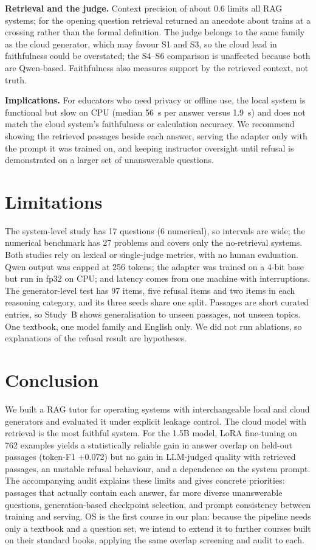 \documentclass[conference]{IEEEtran}
\begin{document}
\textbf{Retrieval and the judge.} Context precision of about 0.6 limits all RAG systems; for the opening question retrieval returned an anecdote about trains at a crossing rather than the formal definition. The judge belongs to the same family as the cloud generator, which may favour S1 and S3, so the cloud lead in faithfulness could be overstated; the S4--S6 comparison is unaffected because both are Qwen-based. Faithfulness also measures support by the retrieved context, not truth.

\textbf{Implications.} For educators who need privacy or offline use, the local system is functional but slow on CPU (median 56~s per answer versus 1.9~s) and does not match the cloud system's faithfulness or calculation accuracy. We recommend showing the retrieved passages beside each answer, serving the adapter only with the prompt it was trained on, and keeping instructor oversight until refusal is demonstrated on a larger set of unanswerable questions.

\section{Limitations}\label{sec:limits}
The system-level study has 17 questions (6 numerical), so intervals are wide; the numerical benchmark has 27 problems and covers only the no-retrieval systems. Both studies rely on lexical or single-judge metrics, with no human evaluation. Qwen output was capped at 256 tokens; the adapter was trained on a 4-bit base but run in fp32 on CPU; and latency comes from one machine with interruptions. The generator-level test has 97 items, five refusal items and two items in each reasoning category, and its three seeds share one split. Passages are short curated entries, so Study~B shows generalisation to unseen passages, not unseen topics. One textbook, one model family and English only. We did not run ablations, so explanations of the refusal result are hypotheses.

\section{Conclusion}\label{sec:conclusion}
We built a RAG tutor for operating systems with interchangeable local and cloud generators and evaluated it under explicit leakage control. The cloud model with retrieval is the most faithful system. For the 1.5B model, LoRA fine-tuning on 762 examples yields a statistically reliable gain in answer overlap on held-out passages (token-F1 $+0.072$) but no gain in LLM-judged quality with retrieved passages, an unstable refusal behaviour, and a dependence on the system prompt. The accompanying audit explains these limits and gives concrete priorities: passages that actually contain each answer, far more diverse unanswerable questions, generation-based checkpoint selection, and prompt consistency between training and serving. OS is the first course in our plan: because the pipeline needs only a textbook and a question set, we intend to extend it to further courses built on their standard books, applying the same overlap screening and audit to each.
\end{document}
